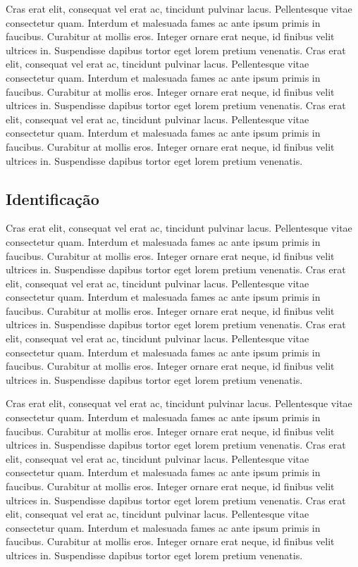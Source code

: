 \documentclass[./main.tex]{subfiles}
\begin{document}
\par Cras erat elit, consequat vel erat ac, tincidunt pulvinar lacus. Pellentesque vitae consectetur quam. Interdum et malesuada fames ac ante ipsum primis in faucibus. Curabitur at mollis eros. Integer ornare erat neque, id finibus velit ultrices in. Suspendisse dapibus tortor eget lorem pretium venenatis. Cras erat elit, consequat vel erat ac, tincidunt pulvinar lacus. Pellentesque vitae consectetur quam. Interdum et malesuada fames ac ante ipsum primis in faucibus. Curabitur at mollis eros. Integer ornare erat neque, id finibus velit ultrices in. Suspendisse dapibus tortor eget lorem pretium venenatis. Cras erat elit, consequat vel erat ac, tincidunt pulvinar lacus. Pellentesque vitae consectetur quam. Interdum et malesuada fames ac ante ipsum primis in faucibus. Curabitur at mollis eros. Integer ornare erat neque, id finibus velit ultrices in. Suspendisse dapibus tortor eget lorem pretium venenatis.

\subsection{Identificação}

\par Cras erat elit, consequat vel erat ac, tincidunt pulvinar lacus. Pellentesque vitae consectetur quam. Interdum et malesuada fames ac ante ipsum primis in faucibus. Curabitur at mollis eros. Integer ornare erat neque, id finibus velit ultrices in. Suspendisse dapibus tortor eget lorem pretium venenatis. Cras erat elit, consequat vel erat ac, tincidunt pulvinar lacus. Pellentesque vitae consectetur quam. Interdum et malesuada fames ac ante ipsum primis in faucibus. Curabitur at mollis eros. Integer ornare erat neque, id finibus velit ultrices in. Suspendisse dapibus tortor eget lorem pretium venenatis. Cras erat elit, consequat vel erat ac, tincidunt pulvinar lacus. Pellentesque vitae consectetur quam. Interdum et malesuada fames ac ante ipsum primis in faucibus. Curabitur at mollis eros. Integer ornare erat neque, id finibus velit ultrices in. Suspendisse dapibus tortor eget lorem pretium venenatis.

\par Cras erat elit, consequat vel erat ac, tincidunt pulvinar lacus. Pellentesque vitae consectetur quam. Interdum et malesuada fames ac ante ipsum primis in faucibus. Curabitur at mollis eros. Integer ornare erat neque, id finibus velit ultrices in. Suspendisse dapibus tortor eget lorem pretium venenatis. Cras erat elit, consequat vel erat ac, tincidunt pulvinar lacus. Pellentesque vitae consectetur quam. Interdum et malesuada fames ac ante ipsum primis in faucibus. Curabitur at mollis eros. Integer ornare erat neque, id finibus velit ultrices in. Suspendisse dapibus tortor eget lorem pretium venenatis. Cras erat elit, consequat vel erat ac, tincidunt pulvinar lacus. Pellentesque vitae consectetur quam. Interdum et malesuada fames ac ante ipsum primis in faucibus. Curabitur at mollis eros. Integer ornare erat neque, id finibus velit ultrices in. Suspendisse dapibus tortor eget lorem pretium venenatis.
\end{document}
